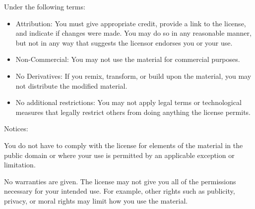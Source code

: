 \documentclass[11pt,openany]{memoir}
\begin{document}
Under the following terms:

\begin{itemize}
\item Attribution: You must give appropriate credit, provide a link to 
the
license, and indicate if changes were made. You may do so in any
reasonable manner, but not in any way that suggests the licensor
endorses you or your use. 

\item Non-Commercial: You may not use the material for commercial 
purposes.

\item No Derivatives: If you remix, transform, or build upon the
material, you may not distribute the modified material.

\item No additional restrictions: You may not apply legal terms or
technological measures that legally restrict others from doing anything
the license permits.
\end{itemize}

Notices:

You do not have to comply with the license for elements of the material
in the public domain or where your use is permitted by an applicable
exception or limitation.

No warranties are given. The license may not give you all of the
permissions necessary for your intended use. For example, other rights
such as publicity, privacy, or moral rights may limit how you use the
material. 

\end{document}
